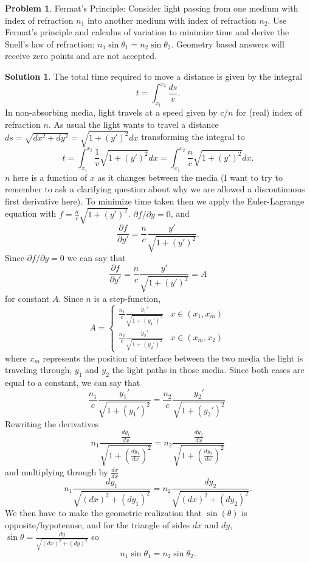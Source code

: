\documentclass[10pt]{article}
\theoremstyle{definition}
\newtheorem{problem}{Problem}
\newtheorem{soln}{Solution}
\begin{document}
\begin{problem}
Fermat's Principle: Consider light passing from one medium with index of refraction $n_1$ into
another medium with index of refraction $n_2$. Use Fermat's principle and calculus of variation to
minimize time and derive the Snell's law of refraction: $n_1\sin\theta_1=n_2\sin\theta_2$. Geometry based
answers will receive zero points and are not accepted.
\end{problem}
\begin{soln}
  The total time required to move a distance is given by the integral
  $$t=\int_{x_1}^{x_2}\frac{ds}{v}.$$
  In non-absorbing media, light travels at a speed given by $c/n$ for (real) index of refraction $n$.
  As usual the light wants to travel a distance $ds=\sqrt{dx^2+dy^2}=\sqrt{1+(y')^2}dx$ transforming the integral to
  $$t=\int_{x_1}^{x_2}\frac{1}{v}\sqrt{1+(y')^2}dx=\int_{x_1}^{x_2}\frac{n}{c}\sqrt{1+(y')^2}dx.$$
  $n$ here is a function of $x$ as it changes between the media (I want to try to remember to ask a clarifying question
  about why we are allowed a discontinuous first derivative here). To minimize time taken then we apply the Euler-Lagrange equation
  with $f=\frac{n}{c}\sqrt{1+(y')^2}$. $\partial f/\partial y=0$, and
  $$\frac{\partial f}{\partial y'}=\frac{n}{c}\frac{y'}{\sqrt{1+(y')^2}}.$$
  Since $\partial f/\partial y=0$ we can say that
  $$\frac{\partial f}{\partial y'}=\frac{n}{c}\frac{y'}{\sqrt{1+(y')^2}}=A$$
  for constant $A$. Since $n$ is a step-function,
  $$A=\begin{cases}
      \frac{n_1}{c}\frac{y_1'}{\sqrt{1+(y_1')^2}} & x\in(x_1,x_m) \\
      \frac{n_2}{c}\frac{y_2'}{\sqrt{1+(y_2')^2}} & x\in(x_m,x_2)
    \end{cases}$$
  where $x_m$ represents the position of interface between the two media the light is traveling through, $y_1$ and $y_2$ the light paths in those media.
  Since both cases are equal to a constant, we can say that
  $$\frac{n_1}{c}\frac{y_1'}{\sqrt{1+(y_1')^2}}=\frac{n_2}{c}\frac{y_2'}{\sqrt{1+(y_2')^2}}.$$
  Rewriting the derivatives
  $$n_1\frac{\frac{dy_1}{dx}}{\sqrt{1+(\frac{dy_1}{dx})^2}}=n_2\frac{\frac{dy_2}{dx}}{\sqrt{1+(\frac{dy_2}{dx})^2}}$$
  and multiplying through by $\frac{dx}{dx}$
  $$n_1\frac{dy_1}{\sqrt{(dx)^2+(dy_1)^2}}=n_2\frac{dy_2}{\sqrt{(dx)^2+(dy_2)^2}}.$$
  We then have to make the geometric realization that $\sin(\theta)$ is opposite/hypotenuse, and for the triangle of sides
  $dx$ and $dy$, $\sin\theta=\frac{dy}{\sqrt{(dx)^2+(dy)^2}}$
  so
  $$n_1\sin\theta_1=n_2\sin\theta_2.$$
\end{soln}
\end{document}
